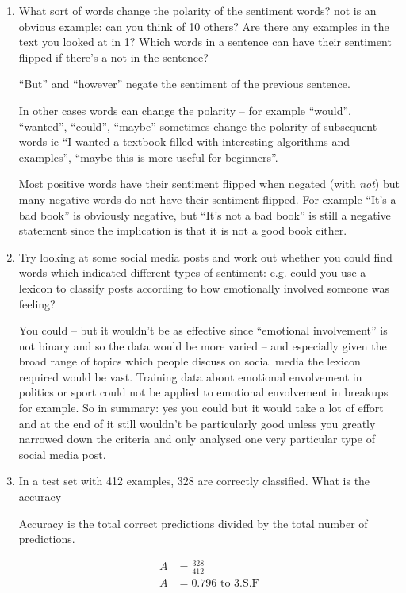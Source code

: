 \documentclass[10pt,\jkfside,a4paper]{article}
\begin{document}
\begin{enumerate}
\item What sort of words change the polarity of the sentiment words? not is an
obvious example: can you think of 10 others? Are there any examples in
the text you looked at in 1? Which words in a sentence can have their
sentiment flipped if there’s a not in the sentence?

``But'' and ``however'' negate the sentiment of the previous sentence.

In other cases words can change the polarity -- for example ``would'', ``wanted'', ``could'', ``maybe'' 
sometimes change the polarity of subsequent words ie ``I wanted a textbook filled with interesting algorithms 
and examples'', ``maybe this is more useful for beginners''. 

Most positive words have their sentiment flipped when negated (with \textit{not}) but many negative 
words do not have their sentiment flipped. For example ``It's a bad book'' is obviously negative, but 
``It's not a bad book'' is still a negative statement since the implication is that it is not a good 
book either.

\item Try looking at some social media posts and work out whether you could
find words which indicated different types of sentiment: e.g. could you use
a lexicon to classify posts according to how emotionally involved someone
was feeling?

You could -- but it wouldn't be as effective since ``emotional involvement'' is not binary and so the data would be 
more varied -- and especially given the broad range of topics which people discuss on social media the lexicon 
required would be vast. Training data about emotional envolvement in politics or sport could not be 
applied to emotional envolvement in breakups for example. So in summary: yes you could but it would take a lot of effort and at the end of it 
still wouldn't be particularly good unless you greatly narrowed down the criteria and only 
analysed one very particular type of social media post.

\item In a test set with 412 examples, 328 are correctly classified. What is the
accuracy

Accuracy is the total correct predictions divided by the total number of predictions.

\begin{equation}
\begin{split}
A &= \frac{328}{412}\\
A &= 0.796 \text{ to 3.S.F}\\
\end{split}
\end{equation}


\end{enumerate}
\end{document}
